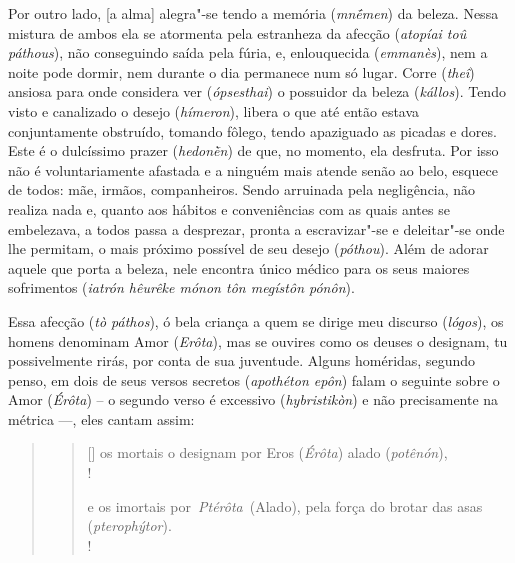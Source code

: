 Por outro lado, [a alma] alegra"-se tendo a memória (\emph{mnḗmen})
da beleza. Nessa mistura de ambos ela se atormenta pela estranheza da
afecção (\emph{atopíai toû páthous}), não conseguindo saída pela fúria,
e, enlouquecida (\emph{emmanès}), nem a noite pode dormir, nem durante o
dia permanece num só lugar. \bekker{[251e]} Corre (\emph{theî}) ansiosa para
onde considera ver (\emph{ópsesthai}) o possuidor da beleza
(\emph{kállos}). Tendo visto e canalizado o desejo (\emph{hímeron}),
libera o que até então estava conjuntamente obstruído, tomando fôlego,
tendo apaziguado as picadas e dores. Este é o dulcíssimo prazer
(\emph{hedonḕn}) de que, no momento, ela desfruta. Por isso não é
voluntariamente afastada e a ninguém mais atende senão ao belo,
\bekker{[252a]} esquece de todos: mãe, irmãos, companheiros. Sendo arruinada
pela negligência, não realiza nada e, quanto aos hábitos e conveniências
com as quais antes se embelezava, a todos passa a desprezar, pronta a
escravizar"-se e deleitar"-se onde lhe permitam, o mais próximo possível
de seu desejo (\emph{póthou}). Além de adorar aquele que porta a beleza,
nele encontra único médico para os seus maiores sofrimentos
(\emph{iatrón hêurêke mónon tôn megístôn pónôn}).

\bekker{[252b]} Essa afecção (\emph{tò páthos}), ó bela criança a quem se
dirige meu discurso (\emph{lógos}), os homens denominam Amor
(\emph{Erôta}), mas se ouvires como os deuses o designam, tu
possivelmente rirás, por conta de sua juventude. Alguns homéridas,
segundo penso, em dois de seus versos secretos (\emph{apothéton epôn})
falam o seguinte sobre o Amor (\emph{Érôta}) -- o segundo verso é
excessivo (\emph{hybristikòn}) e não precisamente na métrica \mbox{---,} eles
cantam assim:

\begin{quote}
 


\begin{verse}[\versewidth]
os mortais o designam por Eros (\emph{Érôta}) alado (\emph{potênón}),\\!

e os imortais por\emph{~Ptérôta}~(Alado), pela força do brotar das asas
(\emph{pterophýtor}).\\!
\end{verse} 
\end{quote}

